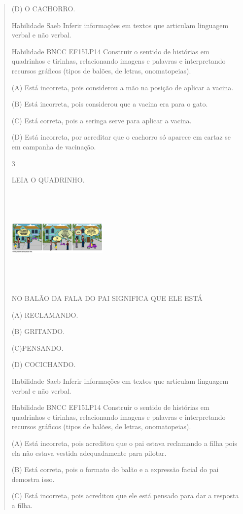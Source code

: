 {{{{\begin{verse}
{{\begin{escolha}
{{{{{(D) O CACHORRO.

Habilidade Saeb Inferir informações em textos que articulam linguagem
verbal e não verbal.

Habilidade BNCC EF15LP14 Construir o sentido de histórias em quadrinhos
e tirinhas, relacionando imagens e palavras e interpretando recursos
gráficos (tipos de balões, de letras, onomatopeias).

(A) Está incorreta, pois considerou a mão na posição de aplicar a
vacina.

(B) Está incorreta, pois considerou que a vacina era para o gato.

(C) Está correta, pois a seringa serve para aplicar a vacina.

(D) Está incorreta, por acreditar que o cachorro só aparece em cartaz se
em campanha de vacinação.

\num{3}

LEIA O QUADRINHO.

\includegraphics[width=1.92014in,height=1.95486in]{media/image138.png}

NO BALÃO DA FALA DO PAI SIGNIFICA QUE ELE ESTÁ

(A) RECLAMANDO.

(B) GRITANDO.

(C)PENSANDO.

(D) COCICHANDO.

Habilidade Saeb Inferir informações em textos que articulam linguagem
verbal e não verbal.

Habilidade BNCC EF15LP14 Construir o sentido de histórias em quadrinhos
e tirinhas, relacionando imagens e palavras e interpretando recursos
gráficos (tipos de balões, de letras, onomatopeias).

(A) Está incorreta, pois acreditou que o pai estava reclamando a filha
pois ela não estava vestida adequadamente para pilotar.

(B) Está correta, pois o formato do balão e a expressão facial do pai
demostra isso.

(C) Está incorreta, pois acreditou que ele está pensado para dar a
resposta a filha.

}}}}}
\end{escolha}}}
\end{verse}}}}}
